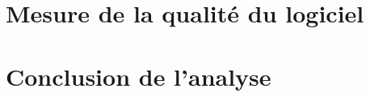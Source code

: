 \documentclass[12pt, openany]{report}
\begin{document}
\section{Mesure de la qualité du logiciel} 
\section{Conclusion de l'analyse}





%
%
\end{document}
